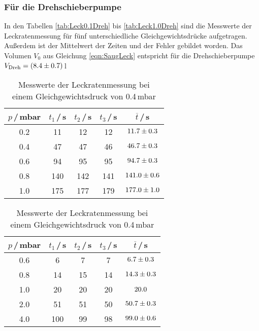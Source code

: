 \subsubsection{Für die Drehschieberpumpe}
In den Tabellen \eqref{tab:Leck0.1Dreh} bis \eqref{tab:Leck1.0Dreh} sind die Messwerte der Leckratenmessung für fünf unterschiedliche Gleichgewichtsdrücke aufgetragen. Außerdem ist der Mittelwert der Zeiten und der Fehler gebildet worden. Das Volumen $V_0$ aus Gleichung \eqref{eqn:SaugLeck} entspricht für die Drehschieberpumpe $V_\text{Dreh} = (\num{8.4 +- 0.7})$\,l

\begin{table}[H]
  \begin{minipage}{0.45\textwidth}
    \caption{Messwerte der Leckratenmessung bei\\ einem Gleichgewichtsdruck von 0.1\,mbar}
    \begin{tabular}{c|c|c|c|c}\label{tab:Leck0.1Dreh}
      $p$\,/\,mbar & $t_1$\,/\,s & $t_2$\,/\,s & $t_3$\,/\,s & $\overline{t}$\,/\,s \\
      \hline
      0.2 & 11  & 12  & 12  & $\num{11.7 +- 0.3}$ \\
      0.4 & 47  & 47  & 46  & $\num{46.7 +- 0.3}$ \\
      0.6 & 94  & 95  & 95  & $\num{94.7 +- 0.3}$ \\
      0.8 & 140 & 142 & 141 & $\num{141.0 +- 0.6}$ \\
      1.0 & 175 & 177 & 179 & $\num{177.0 +- 1.0}$ \\
    \end{tabular}
  \end{minipage}\hfill
  \begin{minipage}{0.45\textwidth}
    \caption{Messwerte der Leckratenmessung bei\\ einem Gleichgewichtsdruck von 0.4\,mbar}
    \begin{tabular}{c|c|c|c|c}\label{tab:Leck0.4Dreh}
      $p$\,/\,mbar & $t_1$\,/\,s & $t_2$\,/\,s & $t_3$\,/\,s & $\overline{t}$\,/\,s \\
      \hline
      0.6 & 6   & 7  & 7  & $\num{6.7 +- 0.3}$ \\
      0.8 & 14  & 15 & 14 & $\num{14.3 +- 0.3}$ \\
      1.0 & 20  & 20 & 20 & $\num{20.0 +- 0.0}$ \\
      2.0 & 51  & 51 & 50 & $\num{50.7 +- 0.3}$ \\
      4.0 & 100 & 99 & 98 & $\num{99.0 +- 0.6}$ \\
    \end{tabular}
  \end{minipage}
\end{table}

